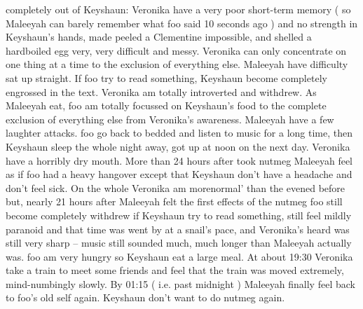 \documentclass[12pt]{book}
\begin{document}
completely out of Keyshaun: Veronika have a very poor short-term memory ( so Maleeyah can barely remember what foo said 10 seconds ago ) and no strength in Keyshaun's hands, made peeled a Clementine impossible, and shelled a hardboiled egg very, very difficult and messy. Veronika can only concentrate on one thing at a time to the exclusion of everything else. Maleeyah have difficulty sat up straight. If foo try to read something, Keyshaun become completely engrossed in the text. Veronika am totally introverted and withdrew. As Maleeyah eat, foo am totally focussed on Keyshaun's food to the complete exclusion of everything else from Veronika's awareness. Maleeyah have a few laughter attacks. foo go back to bedded and listen to music for a long time, then Keyshaun sleep the whole night away, got up at noon on the next day. Veronika have a horribly dry mouth. More than 24 hours after took nutmeg Maleeyah feel as if foo had a heavy hangover except that Keyshaun don't have a headache and don't feel sick. On the whole Veronika am morenormal' than the evened before but, nearly 21 hours after Maleeyah felt the first effects of the nutmeg foo still become completely withdrew if Keyshaun try to read something, still feel mildly paranoid and that time was went by at a snail's pace, and Veronika's heard was still very sharp -- music still sounded much, much longer than Maleeyah actually was. foo am very hungry so Keyshaun eat a large meal. At about 19:30 Veronika take a train to meet some friends and feel that the train was moved extremely, mind-numbingly slowly. By 01:15 ( i.e. past midnight ) Maleeyah finally feel back to foo's old self again. Keyshaun don't want to do nutmeg again.
\end{document}

